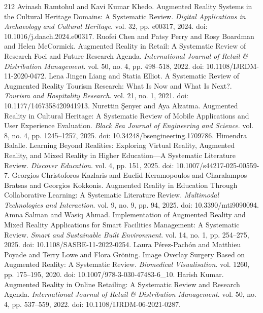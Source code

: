 \begin{thebibliography}{212}
 Avinash Ramtohul and Kavi Kumar Khedo. Augmented Reality Systems in the Cultural Heritage Domains: A Systematic Review. \emph{Digital Applications in Archaeology and Cultural Heritage}. vol. 32, pp. e00317, 2024. doi: 10.1016/j.daach.2024.e00317.
 Ruofei Chen and Patsy Perry and Rosy Boardman and Helen McCormick. Augmented Reality in Retail: A Systematic Review of Research Foci and Future Research Agenda. \emph{International Journal of Retail \& Distribution Management}. vol. 50, no. 4, pp. 498--518, 2022. doi: 10.1108/IJRDM-11-2020-0472.
 Lena Jingen Liang and Statia Elliot. A Systematic Review of Augmented Reality Tourism Research: What Is Now and What Is Next?. \emph{Tourism and Hospitality Research}. vol. 21, no. 1, 2021. doi: 10.1177/1467358420941913.
 Nurettin {\c{S}}enyer and Aya Alzatma. Augmented Reality in Cultural Heritage: A Systematic Review of Mobile Applications and User Experience Evaluation. \emph{Black Sea Journal of Engineering and Science}. vol. 8, no. 4, pp. 1245--1257, 2025. doi: 10.34248/bsengineering.1709786.
 Himendra Balalle. Learning Beyond Realities: Exploring Virtual Reality, Augmented Reality, and Mixed Reality in Higher Education---A Systematic Literature Review. \emph{Discover Education}. vol. 4, pp. 151, 2025. doi: 10.1007/s44217-025-00559-7.
 Georgios Christoforos Kazlaris and Euclid Keramopoulos and Charalampos Bratsas and Georgios Kokkonis. Augmented Reality in Education Through Collaborative Learning: A Systematic Literature Review. \emph{Multimodal Technologies and Interaction}. vol. 9, no. 9, pp. 94, 2025. doi: 10.3390/mti9090094.
 Amna Salman and Wasiq Ahmad. Implementation of Augmented Reality and Mixed Reality Applications for Smart Facilities Management: A Systematic Review. \emph{Smart and Sustainable Built Environment}. vol. 14, no. 1, pp. 254--275, 2025. doi: 10.1108/SASBE-11-2022-0254.
 Laura P{\'e}rez-Pach{\'o}n and Matthieu Poyade and Terry Lowe and Flora Gr{\"o}ning. Image Overlay Surgery Based on Augmented Reality: A Systematic Review. \emph{Biomedical Visualisation}. vol. 1260, pp. 175--195, 2020. doi: 10.1007/978-3-030-47483-6_10.
 Harish Kumar. Augmented Reality in Online Retailing: A Systematic Review and Research Agenda. \emph{International Journal of Retail \& Distribution Management}. vol. 50, no. 4, pp. 537--559, 2022. doi: 10.1108/IJRDM-06-2021-0287.

\end{thebibliography}
